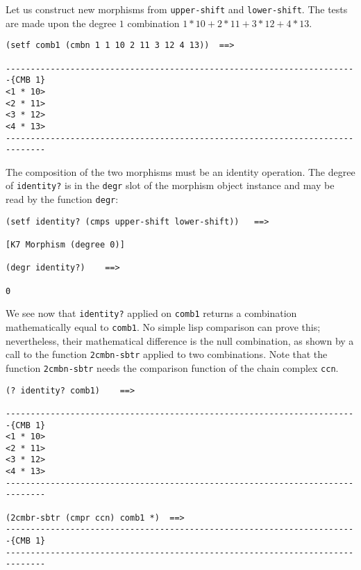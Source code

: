 Let us construct new morphisms from {\tt upper-shift} and {\tt lower-shift}.
The tests are made upon the  degree $1$ combination $1*10 + 2*11 + 3*12 +4*13$.
{\footnotesize\begin{verbatim}
(setf comb1 (cmbn 1 1 10 2 11 3 12 4 13))  ==>

-----------------------------------------------------------------------{CMB 1}
<1 * 10>
<2 * 11>
<3 * 12>
<4 * 13>
------------------------------------------------------------------------------
\end{verbatim}}
The composition of the two morphisms  must be an identity operation.
The degree of {\tt identity?} is in the {\tt degr}  slot of the morphism object instance and may be read
by the function {\tt degr}:
{\footnotesize\begin{verbatim}
(setf identity? (cmps upper-shift lower-shift))   ==>

[K7 Morphism (degree 0)]

(degr identity?)    ==>

0
\end{verbatim}}
We see now that {\tt identity?} applied on {\tt comb1} returns a combination
ma\-the\-ma\-ti\-cal\-ly equal to {\tt comb1}. No simple lisp comparison can prove this;
nevertheless, their mathematical difference is the null combination, as shown by a
call to the function {\tt 2cmbn-sbtr} applied to two combinations. Note that the
function {\tt 2cmbn-sbtr} needs the comparison function of the chain complex {\tt ccn}.
{\footnotesize\begin{verbatim}
(? identity? comb1)    ==>

-----------------------------------------------------------------------{CMB 1}
<1 * 10>
<2 * 11>
<3 * 12>
<4 * 13>
------------------------------------------------------------------------------

(2cmbr-sbtr (cmpr ccn) comb1 *)  ==>
-----------------------------------------------------------------------{CMB 1}
------------------------------------------------------------------------------
\end{verbatim}}

